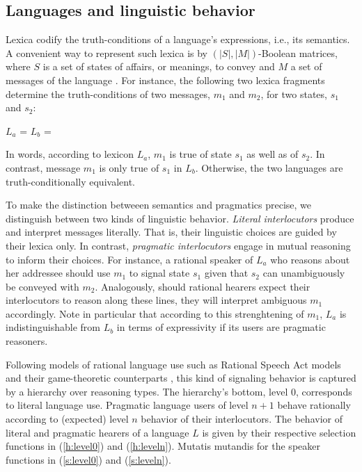 \documentclass[a4paper]{article}
\begin{document}
\subsection{Languages and linguistic behavior}
Lexica codify the truth-conditions of a language's expressions, i.e., its semantics. A convenient way to represent such lexica is by $(|S|,|M|)$-Boolean matrices, where $S$ is a set of states of affairs, or meanings, to convey and $M$ a set of messages of the language \citep{franke+jaeger:2014}. For instance, the following two lexica fragments determine the truth-conditions of two messages, $m_1$ and $m_2$, for two states, $s_1$ and $s_2$:

\begin{centering}
$L_a$ =  \hspace{2cm} $L_b$ = \\[0.5cm]
\end{centering}


In words, according to lexicon $L_a$, $m_1$ is true of state $s_1$ as well as of $s_2$. In contrast, message $m_1$ is only true of $s_1$ in $L_b$. Otherwise, the two languages are truth-conditionally equivalent. 

To make the distinction betweeen semantics and pragmatics precise, we distinguish between two kinds of linguistic behavior. {\em Literal interlocutors} produce and interpret messages literally. That is, their linguistic choices are guided by their lexica only. In contrast, {\em pragmatic interlocutors} engage in mutual reasoning to inform their choices. For instance, a rational speaker of $L_a$ who reasons about her addressee should use $m_1$ to signal state $s_1$ given that $s_2$ can unambiguously be conveyed with $m_2$. Analogously, should rational hearers expect their interlocutors to reason along these lines, they will interpret ambiguous $m_1$ accordingly. Note in particular that according to this strenghtening of $m_1$, $L_a$ is indistinguishable from $L_b$ in terms of expressivity if its users are pragmatic reasoners.

Following models of rational language use such as Rational Speech Act models \citep{frank+goodman:2012} and their game-theoretic counterparts \citep{benz+etal:2005a,franke:2009,franke+jaeger:2014}, this kind of signaling behavior is captured by a hierarchy over reasoning types. The hierarchy's bottom, level $0$, corresponds to literal language use. Pragmatic language users of level $n + 1$ behave rationally according to (expected) level $n$ behavior of their interlocutors. The behavior of literal and pragmatic hearers of a language $L$ is given by their respective selection functions in (\ref{h:level0}) and (\ref{h:leveln}). Mutatis mutandis for the speaker functions in (\ref{s:level0}) and (\ref{s:leveln}).
\end{document}
